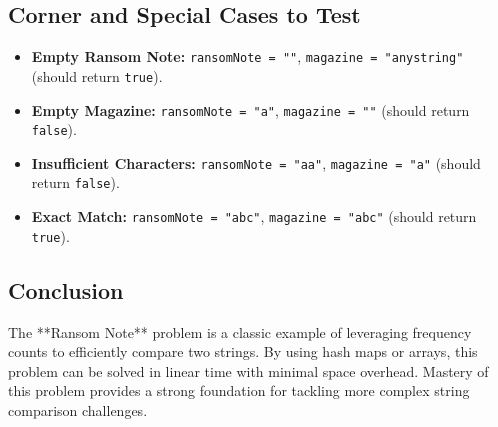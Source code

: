 \subsection*{Corner and Special Cases to Test}
\begin{itemize}
    \item \textbf{Empty Ransom Note:} \texttt{ransomNote = ""}, \texttt{magazine = "anystring"} (should return \texttt{true}).
    \item \textbf{Empty Magazine:} \texttt{ransomNote = "a"}, \texttt{magazine = ""} (should return \texttt{false}).
    \item \textbf{Insufficient Characters:} \texttt{ransomNote = "aa"}, \texttt{magazine = "a"} (should return \texttt{false}).
    \item \textbf{Exact Match:} \texttt{ransomNote = "abc"}, \texttt{magazine = "abc"} (should return \texttt{true}).
\end{itemize}

\subsection*{Conclusion}
The **Ransom Note** problem is a classic example of leveraging frequency counts to efficiently compare two strings. By using hash maps or arrays, this problem can be solved in linear time with minimal space overhead. Mastery of this problem provides a strong foundation for tackling more complex string comparison challenges.